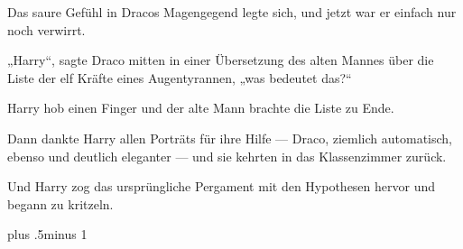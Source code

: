 Das saure Gefühl in Dracos Magengegend legte sich, und jetzt war er einfach nur noch verwirrt.

„Harry“, sagte Draco mitten in einer Übersetzung des alten Mannes über die Liste der elf Kräfte eines Augentyrannen, „was bedeutet das?“

Harry hob einen Finger und der alte Mann brachte die Liste zu Ende.

Dann dankte Harry allen Porträts für ihre Hilfe — Draco, ziemlich automatisch, ebenso und deutlich eleganter — und sie kehrten in das Klassenzimmer zurück.

Und Harry zog das ursprüngliche Pergament mit den Hypothesen hervor und begann zu kritzeln.

\baselineskip plus .5\textheight minus 1\baselineskip

\savetrivseps
\setlength{\topsep}{0pt}
\setlength{\partopsep}{0pt}

